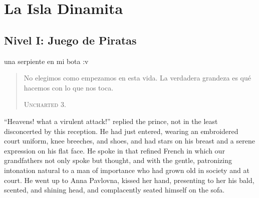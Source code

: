\part*{La Isla Dinamita}


\chapter*{Nivel I: Juego de Piratas} 

 una serpiente en mi bota :v 

\begin{quote} \calli No elegimos como empezamos en esta vida. La verdadera grandeza es qué hacemos con lo que nos toca.

\textsc{Uncharted 3.}
\end{quote}

``Heavens! what a virulent attack!'' replied the prince, not in
the least disconcerted by this reception. He had just entered,
wearing an embroidered court uniform, knee breeches, and shoes,
and had stars on his breast and a serene expression on his flat
face. He spoke in that refined French in which our grandfathers
not only spoke but thought, and with the gentle, patronizing
intonation natural to a man of importance who had grown old in
society and at court. He went up to Anna Pavlovna, kissed her
hand, presenting to her his bald, scented, and shining head, and
complacently seated himself on the sofa.



